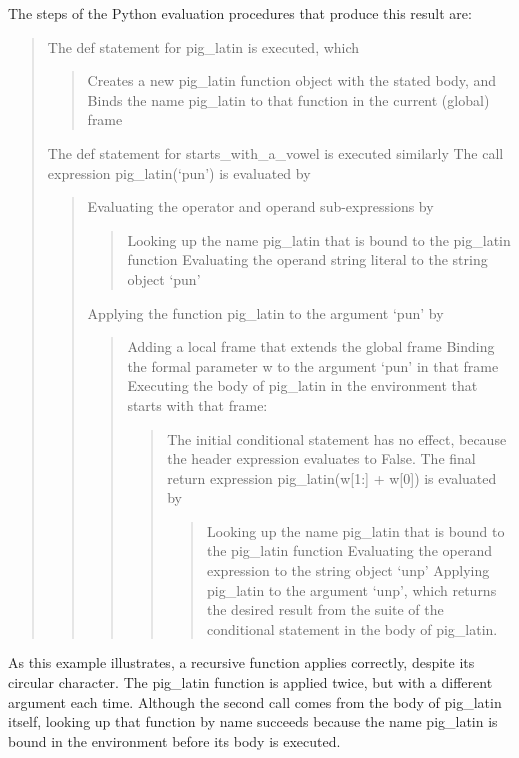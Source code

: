 \documentclass[letterpaper,10pt,dvipdfmx]{sphinxmanual}
\begin{document}
The steps of the Python evaluation procedures that produce this result are:
\begin{quote}

The def statement for pig\_latin is executed, which
\begin{quote}

Creates a new pig\_latin function object with the stated body, and
Binds the name pig\_latin to that function in the current (global) frame
\end{quote}

The def statement for starts\_with\_a\_vowel is executed similarly
The call expression pig\_latin(`pun') is evaluated by
\begin{quote}

Evaluating the operator and operand sub-expressions by
\begin{quote}

Looking up the name pig\_latin that is bound to the pig\_latin function
Evaluating the operand string literal to the string object `pun'
\end{quote}

Applying the function pig\_latin to the argument `pun' by
\begin{quote}

Adding a local frame that extends the global frame
Binding the formal parameter w to the argument `pun' in that frame
Executing the body of pig\_latin in the environment that starts with that frame:
\begin{quote}

The initial conditional statement has no effect, because the header expression evaluates to False.
The final return expression pig\_latin(w{[}1:{]} + w{[}0{]}) is evaluated by
\begin{quote}

Looking up the name pig\_latin that is bound to the pig\_latin function
Evaluating the operand expression to the string object `unp'
Applying pig\_latin to the argument `unp', which returns the desired result from the suite of the conditional statement in the body of pig\_latin.
\end{quote}
\end{quote}
\end{quote}
\end{quote}
\end{quote}

As this example illustrates, a recursive function applies correctly, despite its circular character. The pig\_latin function is applied twice, but with a different argument each time. Although the second call comes from the body of pig\_latin itself, looking up that function by name succeeds because the name pig\_latin is bound in the environment before its body is executed.
\end{document}
